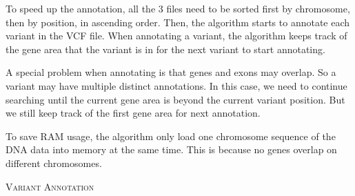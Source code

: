 \documentclass[onehalf,11pt]{beavtex}
\begin{document}
To speed up the annotation, all the 3 files need to be sorted first by chromosome, then by position, in ascending order. Then, the algorithm starts to annotate each variant in the VCF file. When annotating a variant, the algorithm keeps track of the gene area that the variant is in for the next variant to start annotating.

A special problem when annotating is that genes and exons may overlap. So a variant may have multiple distinct annotations. In this case, we need to continue searching until the current gene area is beyond the current variant position. But we still keep track of the first gene area for next annotation.

To save RAM usage, the algorithm only load one chromosome sequence of the DNA data into memory at the same time. This is because no genes overlap on different chromosomes.



\IncMargin{1em}
\begin{algorithm}[h!]
 \label{alg:ANN}
 \SetAlgoLined

     \BlankLine
 \caption{\textsc{Variant Annotation}}
\end{algorithm}\DecMargin{1em} 
\end{document}
